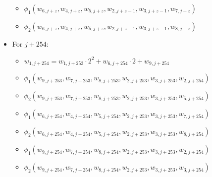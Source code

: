 \begin{itemize}
\begin{itemize}
            \item $\phi_1(w_{6, j + z}, w_{4, j + z}, w_{5, j + z}, w_{2, j + z - 1}, w_{3, j + z - 1}, w_{7, j + z})$
            \item $\phi_2(w_{6, j + z}, w_{4, j + z}, w_{5, j + z}, w_{2, j + z - 1}, w_{3, j + z - 1}, w_{8, j + z})$         
        \end{itemize}
    \item For $j + 254$:
        \begin{itemize}
            \item $w_{1, j + 254} = w_{1, j + 253} \cdot 2^2 + w_{6, j + 254} \cdot 2 + w_{9, j + 254}$
            \item $\phi_1(w_{9, j + 253}, w_{7, j + 253}, w_{8, j + 253}, w_{2, j + 253}, w_{3, j + 253}, w_{2, j + 254})$
            \item $\phi_2(w_{9, j + 253}, w_{7, j + 253}, w_{8, j + 253}, w_{2, j + 253}, w_{3, j + 253}, w_{5, j + 254})$
            \item $\phi_1(w_{6, j + 254}, w_{4, j + 254}, w_{5, j + 254}, w_{2, j + 253}, w_{3, j + 253}, w_{7, j + 254})$
            \item $\phi_2(w_{6, j + 254}, w_{4, j + 254}, w_{5, j + 254}, w_{2, j + 253}, w_{3, j + 253}, w_{8, j + 254})$
            \item $\phi_1(w_{9, j + 254}, w_{7, j + 254}, w_{8, j + 254}, w_{2, j + 253}, w_{3, j + 253}, w_{2, j + 254})$
            \item $\phi_2(w_{9, j + 254}, w_{7, j + 254}, w_{8, j + 254}, w_{2, j + 253}, w_{3, j + 253}, w_{3, j + 254})$ 
        \end{itemize}

\end{itemize}
